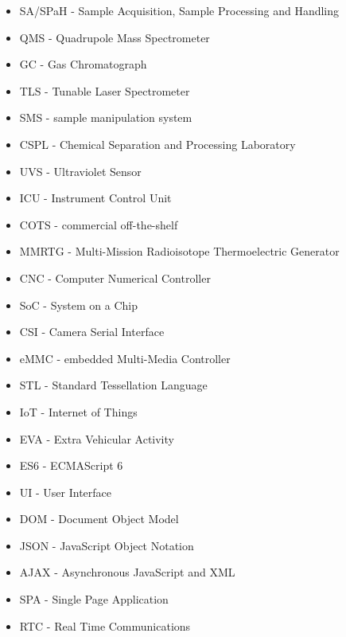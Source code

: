 \begin{itemize}
\item SA/SPaH - Sample Acquisition, Sample Processing and Handling
\item QMS - Quadrupole Mass Spectrometer
\item GC - Gas Chromatograph
\item TLS - Tunable Laser Spectrometer
\item SMS - sample manipulation system
\item CSPL - Chemical Separation and Processing Laboratory
\item UVS - Ultraviolet Sensor
\item ICU - Instrument Control Unit
\item COTS - commercial off-the-shelf
\item MMRTG - Multi-Mission Radioisotope Thermoelectric Generator
\item CNC - Computer Numerical Controller
\item SoC - System on a Chip
\item CSI - Camera Serial Interface
\item eMMC - embedded Multi-Media Controller
\item STL - Standard Tessellation Language
\item IoT - Internet of Things
\item EVA - Extra Vehicular Activity
\item ES6 - ECMAScript 6
\item UI - User Interface
\item DOM - Document Object Model
\item JSON - JavaScript Object Notation
\item AJAX - Asynchronous JavaScript and XML
\item SPA - Single Page Application
\item RTC - Real Time Communications
\end{itemize}